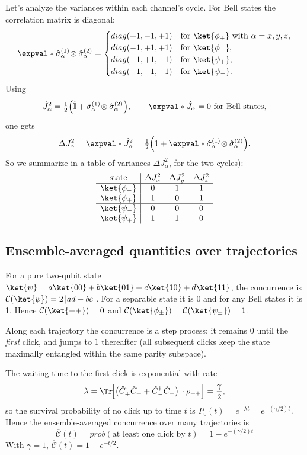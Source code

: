 Let's analyze the variances within each channel's cycle. For Bell states the correlation matrix is diagonal:
\[
\expval*{\hat\sigma_\alpha^{(1)}\!\otimes \hat\sigma_\alpha^{(2)}}=
\begin{cases}
	diag(+1, -1, +1) & \text{for }\ket{\phi_+}\ \text{with }\alpha=x,y,z,\\
	diag(-1, +1, +1) & \text{for }\ket{\phi_-},\\
	diag(+1, +1, -1) & \text{for }\ket{\psi_+},\\
	diag(-1, -1, -1) & \text{for }\ket{\psi_-}.
\end{cases}
\]
Using
\[
\hat J_\alpha^2=\tfrac{1}{2}\Big(\hat{\mathbb{I}}+\hat\sigma_\alpha^{(1)}\!\otimes \hat\sigma_\alpha^{(2)}\Big),
\qquad \expval*{\hat J_\alpha}=0\ \text{for Bell states},
\]
one gets
\[
\Delta J_\alpha^2=\expval*{\hat J_\alpha^2}
=\tfrac{1}{2}\Big(1+\expval*{\hat\sigma_\alpha^{(1)}\!\otimes \hat\sigma_\alpha^{(2)}}\Big).
\]
\medskip
So we summarize in a table of variances \(\Delta J_\alpha^2\), for the two cycles):
\[
\begin{array}{c|ccc}
	\text{state} & \Delta J_x^2 & \Delta J_y^2 & \Delta J_z^2\\
	\hline
	\ket{\phi_-} & 0 & 1 & 1\\
	\ket{\phi_+} & 1 & 0 & 1\\
	\hline
	\ket{\psi_-} & 0 & 0 & 0\\
	\ket{\psi_+} & 1 & 1 & 0
\end{array}
\]	





\subsection{Ensemble-averaged quantities over trajectories}

For a pure two-qubit state \(\ket{\psi}=a\ket{00}+b\ket{01}+c\ket{10}+d\ket{11}\),
the concurrence is \(\mathcal{C}(\ket{\psi})=2\,\lvert ad-bc\rvert\). For a separable state it is 0 and for any Bell states it is 1.
Hence \(\mathcal{C}(\ket{++})=0\) and \(\mathcal{C}(\ket{\phi_\pm})=\mathcal{C}(\ket{\psi_\pm})=1\).

Along each trajectory the concurrence is a step process: it remains \(0\) until the \emph{first} click, and jumps to \(1\) thereafter (all subsequent clicks keep the state maximally entangled within the same parity subspace).

The waiting time to the first click is exponential with rate
\[
\lambda=\Tr\!\Big[\big(\hat C_+^\dagger \hat C_+ + \hat C_-^\dagger \hat C_-\big)\, \cdot \rho_{++}\Big]=\frac{\gamma}{2},
\]
so the survival probability of no click up to time \(t\) is \(P_0(t)=e^{-\lambda t}=e^{-(\gamma/2)t}\).
Hence the ensemble-averaged concurrence over many trajectories is
\[
\boxed{\ \overline{\mathcal{C}}(t)= prob (\text{at least one click by }t)=1-e^{-(\gamma/2)t}\ } 
\]
With \(\gamma=1\), \(\overline{\mathcal{C}}(t)=1-e^{-t/2}\).

